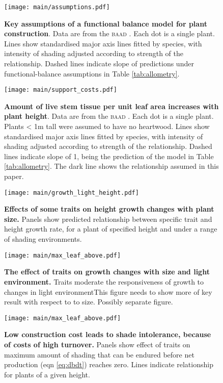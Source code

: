 \documentclass[a4paper,11pt]{article}
\begin{document}
\newpage

\begin{figure}[ht]
\centering
\texttt{[image: main/assumptions.pdf]}
\caption{\textbf{Key assumptions of a functional balance model for plant construction}. Data are from the \textsc{baad} \citep{Falster-2015b}. Each dot is a single plant. Lines show standardised major axis lines fitted by species, with intensity of shading adjusted according to strength of the relationship. Dashed lines indicate slope of predictions under functional-balance assumptions in Table \ref{tab:allometry}. 
\label{fig:assumptions}}
\end{figure}

\begin{figure}[ht]
\centering
\texttt{[image: main/support\_costs.pdf]}
\caption{\textbf{Amount of live stem tissue per unit leaf area increases with plant height}. Data are from the \textsc{baad} \citep{Falster-2015b}. Each dot is a single plant. Plants \textless{}  1m tall were assumed to have no heartwood. Lines show standardised major axis lines fitted by species, with intensity of shading adjusted according to strength of the relationship. Dashed lines indicate slope of 1, being the prediction of the model in Table \ref{tab:allometry}. The dark line shows the relationship assumed in this paper.
\label{fig:support_costs}}
\end{figure}
\newpage

\begin{figure}[ht]
\centering
\texttt{[image: main/growth\_light\_height.pdf]}
\caption{\textbf{Effects of some traits on height growth changes with plant size.} Panels show predicted relationship between specific trait and height growth rate, for a plant of specified height and under a range of shading environments.
\label{fig:growth_light_height}}
\end{figure}


\newpage

\begin{figure}[ht]
\centering
\texttt{[image: main/max\_leaf\_above.pdf]}
\caption{\textbf{The effect of traits on growth changes with size and
light environment.} Traits moderate the responsiveness of growth to changes in light
environmentThis figure needs to show more of key result with respect to to size.
Possibly separate figure. \label{fig:shifts}}
\end{figure}

\newpage

\begin{figure}[ht]
\centering
\texttt{[image: main/max\_leaf\_above.pdf]}
\caption{\textbf{Low construction cost leads to shade intolerance,
because of costs of high turnover.} Panels show effect of traits on
maximum amount of shading that can be endured before net production (eqn
\ref{eq:dbdt}) reaches zero. Lines indicate relationship for plants of a
given height. \label{fig:wplcp}}
\end{figure}
\end{document}
